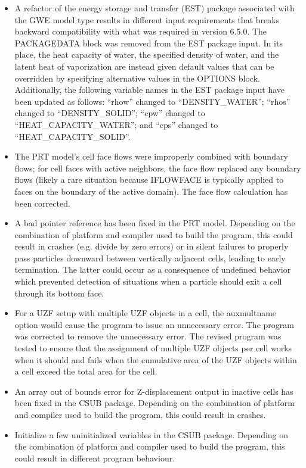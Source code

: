 \begin{itemize}
    \item A refactor of the energy storage and transfer (EST) package associated with the GWE model type results in different input requirements that breaks backward compatibility with what was required in version 6.5.0.  The PACKAGEDATA block was removed from the EST package input.  In its place, the heat capacity of water, the specified density of water, and the latent heat of vaporization are instead given default values that can be overridden by specifying alternative values in the OPTIONS block.  Additionally, the following variable names in the EST package input have been updated as follows: ``rhow'' changed to ``DENSITY\_WATER''; ``rhos'' changed to ``DENSITY\_SOLID''; ``cpw'' changed to ``HEAT\_CAPACITY\_WATER''; and ``cps'' changed to ``HEAT\_CAPACITY\_SOLID''.
    \item The PRT model's cell face flows were improperly combined with boundary flows; for cell faces with active neighbors, the face flow replaced any boundary flows (likely a rare situation because IFLOWFACE is typically applied to faces on the boundary of the active domain). The face flow calculation has been corrected.
    \item A bad pointer reference has been fixed in the PRT model. Depending on the combination of platform and compiler used to build the program, this could result in crashes (e.g. divide by zero errors) or in silent failures to properly pass particles downward between vertically adjacent cells, leading to early termination. The latter could occur as a consequence of undefined behavior which prevented detection of situations when a particle should exit a cell through its bottom face.
    \item For a UZF setup with multiple UZF objects in a cell, the auxmultname option would cause the program to issue an unnecessary error.  The program was corrected to remove the unnecessary error.  The revised program was tested to ensure that the assignment of multiple UZF objects per cell works when it should and fails when the cumulative area of the UZF objects within a cell exceed the total area for the cell.
    \item An array out of bounds error for Z-displacement output in inactive cells has been fixed in the CSUB package. Depending on the combination of platform and compiler used to build the program, this could result in crashes.
    \item Initialize a few uninitialized variables in the CSUB package. Depending on the combination of platform and compiler used to build the program, this could result in different program behaviour.

\end{itemize}
